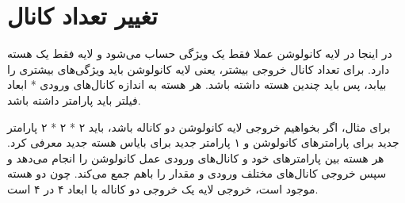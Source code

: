  \section{تغییر تعداد کانال}
 در اینجا در لایه کانولوشن عملا فقط یک ویژگی حساب می‌شود و لایه فقط یک هسته 
  دارد. برای تعداد کانال خروجی بیشتر، یعنی لایه کانولوشن باید ویژگی‌های بیشتری را بیابد، پس باید چندین هسته داشته باشد. هر هسته به اندازه کانال‌های ورودی * ابعاد فیلتر باید پارامتر داشته باشد.
 
 برای مثال، اگر بخواهیم خروجی لایه کانولوشن دو کاناله باشد، باید ۲ * ۲ * ۲ پارامتر جدید برای پارامترهای کانولوشن و ۱ پارامتر جدید برای بایاس هسته جدید معرفی کرد. هر هسته بین پارامترهای خود و کانال‌های ورودی عمل کانولوشن را انجام می‌دهد و سپس خروجی کانال‌های مختلف ورودی  و مقدار    را باهم جمع می‌کند. چون دو هسته موجود است، خروجی لایه یک خروجی دو کاناله با ابعاد ۴ در ۴ است. 
 